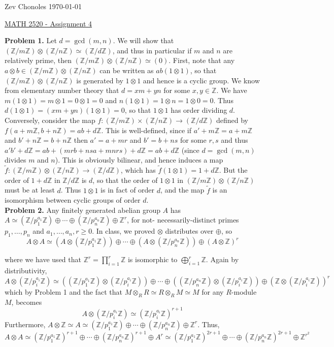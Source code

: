 \documentclass[11pt]{article}
\newcommand{\num}[1]{\noindent \textbf{#1}}
\newcommand{\Z}{\mathbb{Z}}
\theoremstyle{definition}
\begin{document}
\noindent Zev Chonoles \hfill \today\\[-0.4in]
\begin{center}
\noindent \underline{MATH 2520 - Assignment 4}
\end{center}

\num{Problem 1.} Let $d=\gcd(m,n)$. We will show that $(\Z/m\Z)\otimes(\Z/n\Z)\simeq(\Z/d\Z)$, and thus in particular if $m$ and $n$ are relatively prime, then $(\Z/m\Z)\otimes(\Z/n\Z)\simeq(0)$. First, note that any $a\otimes b\in(\Z/m\Z)\otimes(\Z/n\Z)$ can be written as $ab(1\otimes 1)$, so that $(\Z/m\Z)\otimes(\Z/n\Z)$ is generated by $1\otimes 1$ and hence is a cyclic group. We know from elementary number theory that $d=xm+yn$ for some $x,y\in\Z$. We have $m(1\otimes 1)=m\otimes 1=0\otimes 1=0$ and $n(1\otimes 1)=1\otimes n=1\otimes0=0$. Thus $d(1\otimes 1)=(xm+yn)(1\otimes 1)=0$, so that $1\otimes1$ has order dividing $d$.\\

\noindent Conversely, consider the map $f:(\Z/m\Z)\times(\Z/n\Z)\rightarrow(\Z/d\Z)$ defined by $f(a+m\Z,b+n\Z)=ab+d\Z$. This is well-defined, since if $a'+m\Z=a+m\Z$ and $b'+n\Z=b+n\Z$ then $a'=a+mr$ and $b'=b+ns$ for some $r,s$ and thus $a'b'+d\Z=ab+(mrb+nsa+mnrs)+d\Z=ab+d\Z$ (since $d=\gcd(m,n)$ divides $m$ and $n$). This is obviously bilinear, and hence induces a map $\tilde{f}:(\Z/m\Z)\otimes(\Z/n\Z)\rightarrow(\mathbb{Z}/d\mathbb{Z})$, which has $\tilde{f}(1\otimes1)=1+d\mathbb{Z}$. But the order of $1+d\mathbb{Z}$ in $\mathbb{Z}/d\mathbb{Z}$ is $d$, so that the order of $1\otimes1$ in $(\Z/m\Z)\otimes(\Z/n\Z)$ must be at least $d$. Thus $1\otimes1$ is in fact of order $d$, and the map $\tilde{f}$ is an isomorphism between cyclic groups of order $d$. \\

\num{Problem 2.} Any finitely generated abelian group $A$ has $A\simeq (\mathbb{Z}/p_1^{a_1}\mathbb{Z})\oplus\cdots\oplus(\mathbb{Z}/p_n^{a_n}\mathbb{Z})\oplus\mathbb{Z}^r$, for not- necessarily-distinct primes $p_1,\ldots,p_n$ and $a_1,\ldots,a_n,r\geq0$. In class, we proved $\otimes$ distributes over $\oplus$, so
\[A\otimes A\simeq(A\otimes(\Z/p_1^{a_1}\Z))\oplus\cdots\oplus(A\otimes(\Z/p_n^{a_n}\Z))\oplus(A\otimes\Z)^r\]

\noindent where we have used that $\mathbb{Z}^r=\prod_{i=1}^r\mathbb{Z}$ is isomorphic to $\bigoplus_{i=1}^r\mathbb{Z}$. Again by distributivity,
\[A\otimes(\Z/p_i^{a_i}\Z)\simeq ((\mathbb{Z}/p_1^{a_1}\mathbb{Z})\otimes(\mathbb{Z}/p_i^{a_i}\mathbb{Z}))\oplus\cdots\oplus((\mathbb{Z}/p_n^{a_n}\mathbb{Z})\otimes(\mathbb{Z}/p_i^{a_i}\mathbb{Z}))\oplus(\mathbb{Z}\otimes(\mathbb{Z}/p_i^{a_i}\mathbb{Z}))^r\]
which by Problem 1 and the fact that $M\otimes_RR\simeq R\otimes_RM\simeq M$ for any $R$-module $M$, becomes \[A\otimes(\Z/p_i^{a_i}\Z)\simeq(\mathbb{Z}/p_i^{a_i}\mathbb{Z})^{r+1}\]
Furthermore, $A\otimes\Z\simeq A\simeq(\mathbb{Z}/p_1^{a_1}\mathbb{Z})\oplus\cdots\oplus(\mathbb{Z}/p_n^{a_n}\mathbb{Z})\oplus\mathbb{Z}^r$. Thus, 
\[A\otimes A\simeq (\Z/p_1^{a_1}\Z)^{r+1}\oplus\cdots\oplus(\Z/p_n^{a_n}\Z)^{r+1}\oplus A^r\simeq(\Z/p_1^{a_1}\Z)^{2r+1}\oplus\cdots\oplus(\Z/p_n^{a_n}\Z)^{2r+1}\oplus \Z^{r^2}\]
\end{document}
